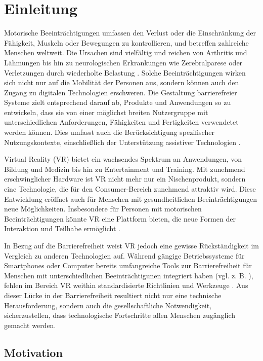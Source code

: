 \chapter{Einleitung}

Motorische Beeinträchtigungen umfassen den Verlust oder die Einschränkung der Fähigkeit, Muskeln oder Bewegungen zu kontrollieren, und betreffen zahlreiche Menschen weltweit. Die Ursachen sind vielfältig und reichen von Arthritis und Lähmungen bis hin zu neurologischen Erkrankungen wie Zerebralparese oder Verletzungen durch wiederholte Belastung \citep{yuan_game_2011}. Solche Beeinträchtigungen wirken sich nicht nur auf die Mobilität der Personen aus, sondern können auch den Zugang zu digitalen Technologien erschweren. Die Gestaltung barrierefreier Systeme zielt entsprechend darauf ab, Produkte und Anwendungen so zu entwickeln, dass sie von einer möglichst breiten Nutzergruppe mit unterschiedlichen Anforderungen, Fähigkeiten und Fertigkeiten verwendetet werden können. Dies umfasst auch die Berücksichtigung spezifischer Nutzungskontexte, einschließlich der Unterstützung assistiver Technologien \citep{DINISO9241}. 

Virtual Reality (VR) bietet ein wachsendes Spektrum an Anwendungen, von Bildung und Medizin bis hin zu Entertainment und Training. Mit zunehmend erschwinglicher Hardware ist VR nicht mehr nur ein Nischenprodukt, sondern eine Technologie, die für den Consumer-Bereich zunehmend attraktiv wird. Diese Entwicklung eröffnet auch für Menschen mit gesundheitlichen Beeinträchtigungen neue Möglichkeiten. Insbesondere für Personen mit motorischen Beeinträchtigungen könnte VR eine Plattform bieten, die neue Formen der Interaktion und Teilhabe ermöglicht \citep{mott_i_2020}.

In Bezug auf die Barrierefreiheit weist VR jedoch eine gewisse Rückständigkeit im Vergleich zu anderen Technologien auf. Während gängige Betriebssysteme für Smartphones oder Computer bereits umfangreiche Tools zur Barrierefreiheit für Menschen mit unterschiedlichen Beeinträchtigunen integriert haben (vgl. z. B.  \citep{apple_einfuhrung_2024}), fehlen im Bereich VR weithin standardisierte Richtlinien und Werkzeuge \citep{ciccone_next_2023}. Aus dieser Lücke in der Barrierefreiheit resultiert nicht nur eine technische Herausforderung, sondern auch die gesellschaftliche Notwendigkeit, sicherzustellen, dass technologische Fortschritte allen Menschen zugänglich gemacht werden.

\section{Motivation}

